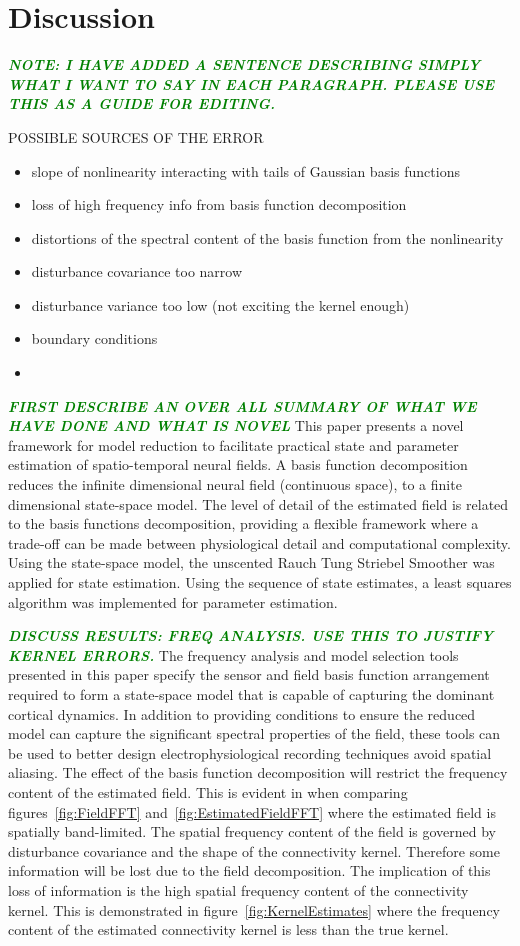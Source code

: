 \documentclass[twocolumn,11pt,a4paper]{article}		%
\newcommand{\dean}[1]{\textsf{\emph{\textbf{\textcolor{green}{#1}}}}}
\begin{document}
\section{Discussion}\label{DiscussionSection}

\dean{NOTE: I HAVE ADDED A SENTENCE DESCRIBING SIMPLY WHAT I WANT TO SAY IN EACH PARAGRAPH. PLEASE USE THIS AS A GUIDE FOR EDITING.}

POSSIBLE SOURCES OF THE ERROR
\begin{itemize}
	\item slope of nonlinearity interacting with tails of Gaussian basis functions
	\item loss of high frequency info from basis function decomposition
	\item distortions of the spectral content of the basis function from the nonlinearity
	\item disturbance covariance too narrow
	\item disturbance variance too low (not exciting the kernel enough)
	\item boundary conditions
	\item
\end{itemize}

\dean{FIRST DESCRIBE AN OVER ALL SUMMARY OF WHAT WE HAVE DONE AND WHAT IS NOVEL}
This paper presents a novel framework for model reduction to facilitate practical state and parameter estimation of spatio-temporal neural fields. A basis function decomposition reduces the infinite dimensional neural field (continuous space), to a finite dimensional state-space model. The level of detail of the estimated field is related to the basis functions decomposition, providing a flexible framework where a trade-off can be made between physiological detail and computational complexity. Using the state-space model, the unscented Rauch Tung Striebel Smoother was applied for state estimation. Using the sequence of state estimates, a least squares algorithm was implemented for parameter estimation.  

\dean{DISCUSS RESULTS: FREQ ANALYSIS. USE THIS TO JUSTIFY KERNEL ERRORS.}
The frequency analysis and model selection tools presented in this paper specify the sensor and field basis function arrangement required to form a state-space model that is capable of capturing the dominant cortical dynamics. In addition to providing conditions to ensure the reduced model can capture the significant spectral properties of the field, these tools can be used to better design electrophysiological recording techniques avoid spatial aliasing. The effect of the basis function decomposition will restrict the frequency content of the estimated field. This is evident in when comparing figures~\ref{fig:FieldFFT} and~\ref{fig:EstimatedFieldFFT} where the estimated field is spatially band-limited. The spatial frequency content of the field is governed by disturbance covariance and the shape of the connectivity kernel. Therefore some information will be lost due to the field decomposition. The implication of this loss of information is the high spatial frequency content of the connectivity kernel. This is demonstrated in figure~\ref{fig:KernelEstimates} where the frequency content of the estimated connectivity kernel is less than the true kernel.
\end{document}
